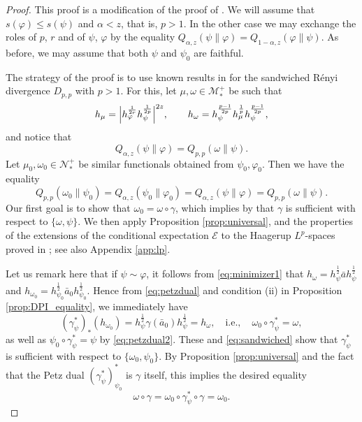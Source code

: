 \documentclass[12pt]{article}
\theoremstyle{definition}
\theoremstyle{remark}
\numberwithin{equation}{section}
\def\cE{\mathcal E}
\def\Me{\mathcal M}
\def\Ne{\mathcal N}
\def\ffi{\varphi}
\begin{document}
\begin{proof} This proof is a modification of the proof of \cite[Theorem
5.1]{jencova2021renyi}.  
We will assume that $s(\ffi)\le s(\psi)$ and $\alpha<z$, that is, $p>1$. In the other case we may
exchange the roles of $p$, $r$ and of $\psi$, $\ffi$ by the equality
$Q_{\alpha,z}(\psi\|\varphi)=Q_{1-\alpha,z}(\varphi\|\psi)$. As before, we may assume that
both $\psi$ and $\psi_0$ are faithful.

The strategy of the proof is to use known results in \cite{jencova2018renyi} for the sandwiched
R\'enyi divergence $D_{p,p}$ with $p>1$. For this, let $\mu,\omega\in\Me_*^+$ be such that
\[
h_{\mu}=\Big|h_{\ffi}^{1\over 2r}h_{\psi}^{1\over 2p}\Big|^{2z},\qquad
h_\omega=h_\psi^{p-1\over 2p}h_\mu^{\frac1p}h_\psi^{p-1\over 2p},
\]
and notice that
\[
Q_{\alpha, z}(\psi\|\ffi)=Q_{p,p}(\omega\|\psi).
\]
Let $\mu_0,\omega_0\in \Ne_*^+$ be similar functionals obtained from $\psi_0,\ffi_0$. Then
we have the equality
\begin{equation}\label{eq:sandwiched}
Q_{p,p}(\omega_0\|\psi_0)=Q_{\alpha,z}(\psi_0\|\ffi_0)=Q_{\alpha,z}(\psi\|\ffi)=Q_{p,p}(\omega\|\psi).
\end{equation}
Our first goal is to show that $\omega_0=\omega\circ\gamma$, which implies by
\cite[Theorem 4.6]{jencova2018renyi} that $\gamma$ is sufficient with respect to $\{\omega,\psi\}$. 
 We then apply Proposition \ref{prop:universal},  and the properties of the extensions of the
conditional expectation $\cE$ to the Haagerup $L^p$-spaces proved in
\cite{junge2003noncommutative}; see also Appendix \ref{app:lp}.

Let us remark here that if $\psi\sim \ffi$, it follows from \eqref{eq:minimizer1} that
$h_\omega=h_\psi^{\frac12}\bar ah_\psi^{\frac12}$ and
$h_{\omega_0}=h_{\psi_0}^{\frac12}\bar a_0h_{\psi_0}^{\frac12}$. Hence from \eqref{eq:petzdual}
and condition (ii) in Proposition \ref{prop:DPI_equality}, we immediately have
\[
(\gamma^*_{\psi})_*(h_{\omega_0})=h_\psi^{\frac12}\gamma(\bar
a_0)h_\psi^{\frac12}=h_\omega,\quad
{\mbox{i.e.},\quad\omega_0\circ\gamma_\psi^*=\omega,}
\]
as well as $\psi_0\circ\gamma_\psi^*=\psi$ by \eqref{eq:petzdual2}.
These and \eqref{eq:sandwiched} show that $\gamma^*_\psi$ is sufficient with respect to
$\{\omega_0,\psi_0\}$. By Proposition \ref{prop:universal} and the fact that the
Petz dual  $(\gamma_\psi^*)_{\psi_0}^*$ is $\gamma$ itself, this implies the desired
equality
\[
\omega\circ\gamma= \omega_0\circ \gamma_\psi^*\circ\gamma=\omega_0.
\]


\end{proof}
\end{document}
